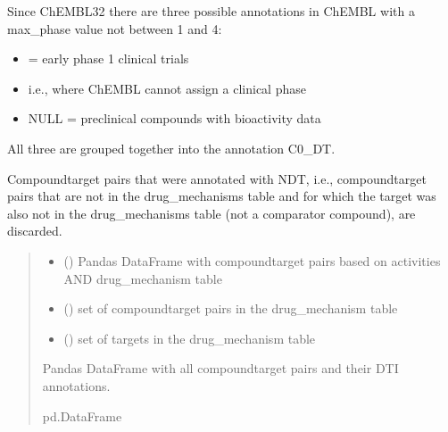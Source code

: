 \documentclass[letterpaper,10pt,english]{sphinxmanual}
\begin{document}
\begin{fulllineitems}
\sphinxAtStartPar
Since ChEMBL32 there are three possible annotations in ChEMBL
with a max\_phase value not between 1 and 4:
\begin{itemize}
\item {} 
 = early phase 1 clinical trials

\item {} \begin{description}
\sphinxAtStartPar
i.e., where ChEMBL cannot assign a clinical phase

\end{description}

\item {} 
\sphinxAtStartPar
NULL = preclinical compounds with bioactivity data

\end{itemize}

\sphinxAtStartPar
All three are grouped together into the annotation C0\_DT.

\sphinxAtStartPar
Compound\sphinxhyphen{}target pairs that were annotated with NDT,
i.e., compound\sphinxhyphen{}target pairs that are not in the drug\_mechanisms table
and for which the target was also not in the drug\_mechanisms table
(not a comparator compound), are discarded.
\begin{quote}\begin{description}
\begin{itemize}
\item {} 
\sphinxAtStartPar
{} () \textendash{} Pandas DataFrame with compound\sphinxhyphen{}target pairs
based on activities AND drug\_mechanism table

\item {} 
\sphinxAtStartPar
{} () \textendash{} set of compound\sphinxhyphen{}target pairs in the drug\_mechanism table

\item {} 
\sphinxAtStartPar
{} () \textendash{} set of targets in the drug\_mechanism table

\end{itemize}

\sphinxAtStartPar
Pandas DataFrame with all compound\sphinxhyphen{}target pairs and their DTI annotations.

\sphinxAtStartPar
pd.DataFrame

\end{description}\end{quote}

\end{fulllineitems}
\end{document}
